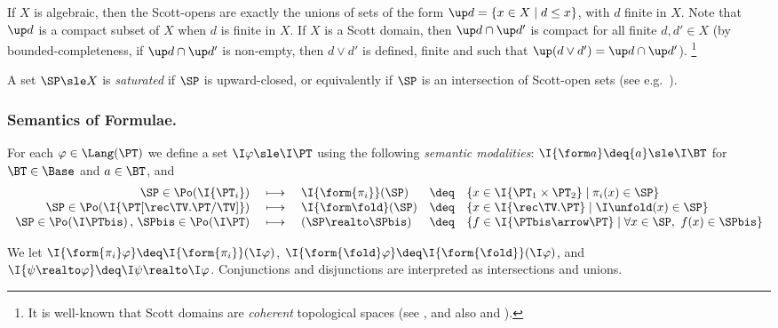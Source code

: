 If $X$ is algebraic, then the Scott-opens are exactly the unions of sets of the form
$\up d = \{ x \in X \mid d \leq x\}$, with $d$ finite in $X$.
%
Note that $\up d$ is a compact subset of $X$ when $d$ is finite in $X$.
If $X$ is a Scott domain, then $\up d \cap \up d'$
is compact for all finite $d,d' \in X$
(by bounded-completeness,
if $\up d \cap \up d'$ is non-empty, then $d \vee d'$
is defined, finite and such that $\up (d \vee d') = \up d \cap \up d'$).%
\footnote{It is well-known that Scott domains are \emph{coherent} topological spaces
(see \cite[Proposition 4.2.17, \S 4.2.3]{aj95chapter},
and also \cite[Definition 5.2.21]{goubault13book}
and \cite[\S 2.3]{gg24book}).}

A set $\SP \sle X$ is \emph{saturated}
if $\SP$ is upward-closed,
or equivalently if $\SP$ is an intersection of Scott-open sets
(see e.g.\ \cite[Proposition 4.2.9]{goubault13book}).


\subsubsection{Semantics of Formulae.}
\label{sec:sem:log}
For each $\varphi \in \Lang(\PT)$ we define a set $\I\varphi \sle \I\PT$
using the following \emph{semantic modalities}:
$\I{\form a} \deq \{a\} \sle \I\BT$
for $\BT \in \Base$ and $a \in \BT$,
and
\begin{equation*}
\begin{array}{r !{~}c!{~} l l l}
  \SP \in \Po(\I{\PT_i})
& \longmapsto
& \I{\form{\pi_i}}(\SP)
& \deq
& \left\{
  x \in \I{\PT_1 \times \PT_2}
  \mid
  \pi_i(x) \in \SP
  \right\}
\\

  \SP \in \Po(\I{\PT[\rec\TV.\PT/\TV]})
& \longmapsto
& \I{\form\fold}(\SP)
& \deq
& \left\{
  x \in \I{\rec\TV.\PT}
  \mid
  \I\unfold(x) \in \SP
  \right\}
\\

  \SP \in \Po(\I\PTbis)
  \,,\,
  \SPbis \in \Po(\I\PT)
& \longmapsto
& (\SP \realto \SPbis)
& \deq
& \left\{
  f \in \I{\PTbis \arrow \PT}
  \mid
  \forall x \in \SP,~ f(x) \in \SPbis
  \right\}
\end{array}
\end{equation*}


\noindent
We let
$\I{\form{\pi_i}\varphi} \deq \I{\form{\pi_i}}(\I\varphi)$,
$\I{\form{\fold}\varphi} \deq \I{\form{\fold}}(\I\varphi)$,
and
$\I{\psi \realto \varphi} \deq \I\psi \realto \I\varphi$.
Conjunctions and disjunctions are interpreted as intersections
and unions. 

